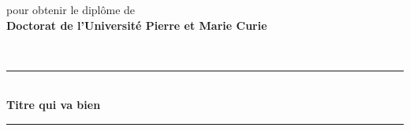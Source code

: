 
\begin{center}
pour obtenir le diplôme de\\
\vspace{6pt}
{\Large \bf Doctorat de l'Universit\'e \vspace{2pt} Pierre et Marie Curie}\\
\end{center}


\begin{center}
{\normalsize {\bf \specialite}}\\
\end{center}

\vspace{62pt}

%
%


\begin{center}
\rule[2mm]{60mm}{0.2mm}\\
{\Large \bf Titre qui va bien\\}
 \rule[-2mm]{60mm}{0.2mm}\\
\end{center}


\vspace{2pt}


\begin{center}
{\it \large \asoutenir}\\
\end{center}

\vspace{2pt}


